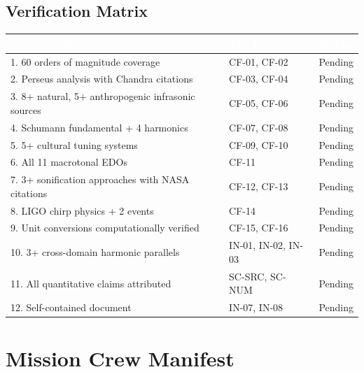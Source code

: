 \documentclass[11pt,letterpaper]{article}
\newcommand{\tableheader}[1]{\textbf{\sffamily\textcolor{white}{#1}}}
\begin{document}
\subsection{Verification Matrix}

\begin{center}
\begin{tabularx}{\textwidth}{XL{3.5cm}C{1.5cm}}
\toprule
{}
\tableheader{Success Criterion} & \tableheader{Test ID(s)} & \tableheader{Status} \\
. 60 orders of magnitude coverage & CF-01, CF-02 & Pending \\
2. Perseus analysis with Chandra citations & CF-03, CF-04 & Pending \\
3. 8+ natural, 5+ anthropogenic infrasonic sources & CF-05, CF-06 & Pending \\
4. Schumann fundamental + 4 harmonics & CF-07, CF-08 & Pending \\
5. 5+ cultural tuning systems & CF-09, CF-10 & Pending \\
6. All 11 macrotonal EDOs & CF-11 & Pending \\
7. 3+ sonification approaches with NASA citations & CF-12, CF-13 & Pending \\
8. LIGO chirp physics + 2 events & CF-14 & Pending \\
9. Unit conversions computationally verified & CF-15, CF-16 & Pending \\
10. 3+ cross-domain harmonic parallels & IN-01, IN-02, IN-03 & Pending \\
11. All quantitative claims attributed & SC-SRC, SC-NUM & Pending \\
12. Self-contained document & IN-07, IN-08 & Pending \\
\bottomrule
\end{tabularx}
\end{center}

\section{Mission Crew Manifest}
\end{document}
